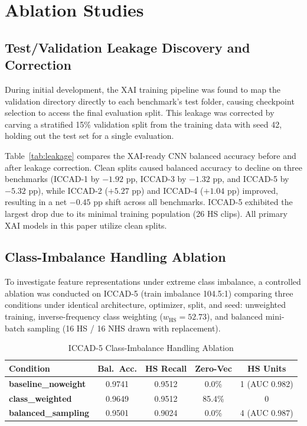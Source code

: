 \documentclass[conference]{IEEEtran}
\begin{document}
\section{Ablation Studies}

\subsection{Test/Validation Leakage Discovery and Correction}
During initial development, the XAI training pipeline was found to map the validation directory directly to each benchmark's test folder, causing checkpoint selection to access the final evaluation split. This leakage was corrected by carving a stratified 15\% validation split from the training data with seed 42, holding out the test set for a single evaluation.

Table~\ref{tab:leakage} compares the XAI-ready CNN balanced accuracy before and after leakage correction. Clean splits caused balanced accuracy to decline on three benchmarks (ICCAD-1 by $-1.92$ pp, ICCAD-3 by $-1.32$ pp, and ICCAD-5 by $-5.32$ pp), while ICCAD-2 ($+5.27$ pp) and ICCAD-4 ($+1.04$ pp) improved, resulting in a net $-0.45$ pp shift across all benchmarks. ICCAD-5 exhibited the largest drop due to its minimal training population (26 HS clips). All primary XAI models in this paper utilize clean splits.

\subsection{Class-Imbalance Handling Ablation}
To investigate feature representations under extreme class imbalance, a controlled ablation was conducted on ICCAD-5 (train imbalance 104.5:1) comparing three conditions under identical architecture, optimizer, split, and seed: unweighted training, inverse-frequency class weighting ($w_{\text{HS}} = 52.73$), and balanced mini-batch sampling (16 HS / 16 NHS drawn with replacement).

\begin{table}[htbp]
\caption{ICCAD-5 Class-Imbalance Handling Ablation}
\label{tab:imbalance_ablation}
\centering
\setlength{\tabcolsep}{1.5pt}
\begin{tabular}{lcccc}
\toprule
\textbf{Condition} & \textbf{Bal.~Acc.} & \textbf{HS Recall} & \textbf{Zero-Vec} & \textbf{HS Units} \\
\midrule
\textbf{baseline\_noweight} & 0.9741 & 0.9512 & 0.0\% & 1 (AUC 0.982) \\
\textbf{class\_weighted} & 0.9649 & 0.9512 & 85.4\% & 0 \\
\textbf{balanced\_sampling} & 0.9501 & 0.9024 & 0.0\% & 4 (AUC 0.987) \\
\bottomrule
\end{tabular}
\end{table}
\end{document}
